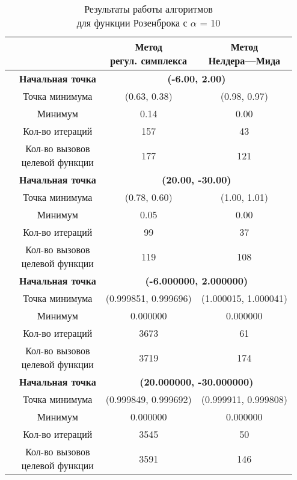 \begin{table}[H]
        \centering
        \vspace*{-1.5em}
        \caption{Результаты работы алгоритмов\\для функции Розенброка с $\alpha$ = 10}
        \footnotesize
        \begin{tabular}{|c|c|c|c|}
        \hline
        & &\makecell{Метод\\регул. симплекса} &\makecell{Метод\\Нелдера---Мида} \\
        \hline
	\multirow{8}{*}{\rotatebox[origin=c]{90}{$\varepsilon = 0.01$}}&\textbf{Начальная точка} &\multicolumn{2}{c|}{\textbf{(-6.00, 2.00)}}\\
	\cline{2-4}
	&Точка минимума &(0.63, 0.38) &(0.98, 0.97) \\ 
	\cline{2-4}
	&Минимум &0.14 &0.00 \\ 
	\cline{2-4}
	&Кол-во итераций &157 &43 \\ 
	\cline{2-4}
	&\makecell{Кол-во вызовов\\целевой функции} &177 &121 \\ 
	\cline{2-4}
\cline{2-4}&\textbf{Начальная точка} &\multicolumn{2}{c|}{\textbf{(20.00, -30.00)}}\\
	\cline{2-4}
	&Точка минимума &(0.78, 0.60) &(1.00, 1.01) \\ 
	\cline{2-4}
	&Минимум &0.05 &0.00 \\ 
	\cline{2-4}
	&Кол-во итераций &99 &37 \\ 
	\cline{2-4}
	&\makecell{Кол-во вызовов\\целевой функции} &119 &108 \\ 
	\cline{2-4}
	\hline
	\multirow{8}{*}{\rotatebox[origin=c]{90}{$\varepsilon = 1e-06$}}&\textbf{Начальная точка} &\multicolumn{2}{c|}{\textbf{(-6.000000, 2.000000)}}\\
	\cline{2-4}
	&Точка минимума &(0.999851, 0.999696) &(1.000015, 1.000041) \\ 
	\cline{2-4}
	&Минимум &0.000000 &0.000000 \\ 
	\cline{2-4}
	&Кол-во итераций &3673 &61 \\ 
	\cline{2-4}
	&\makecell{Кол-во вызовов\\целевой функции} &3719 &174 \\ 
	\cline{2-4}
\cline{2-4}&\textbf{Начальная точка} &\multicolumn{2}{c|}{\textbf{(20.000000, -30.000000)}}\\
	\cline{2-4}
	&Точка минимума &(0.999849, 0.999692) &(0.999911, 0.999808) \\ 
	\cline{2-4}
	&Минимум &0.000000 &0.000000 \\ 
	\cline{2-4}
	&Кол-во итераций &3545 &50 \\ 
	\cline{2-4}
	&\makecell{Кол-во вызовов\\целевой функции} &3591 &146 \\ 
	\cline{2-4}
	\hline

\end{tabular}
\end{table}


